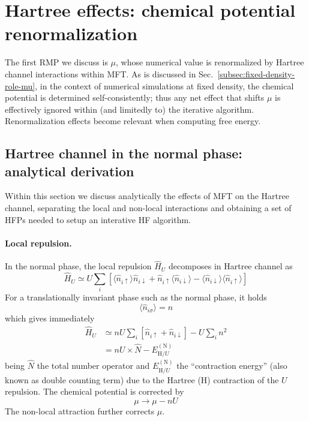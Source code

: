 \section{Hartree effects: chemical potential renormalization}\label{sec:normal-hartree-mu}

The first RMP we discuss is $\mu$, whose numerical value is renormalized by Hartree channel interactions within MFT. As is discussed in Sec.~\ref{subsec:fixed-density-role-mu}, in the context of numerical simulations at fixed density, the chemical potential is determined self-consistently; thus any net effect that shifts $\mu$ is effectively ignored within (and limitedly to) the iterative algorithm. Renormalization effects become relevant when computing free energy.

\subsection{Hartree channel in the normal phase: analytical derivation}\label{subsec:normal-hartree-analytical}

Within this section we discuss analytically the effects of MFT on the Hartree channel, separating the local and non-local interactions and obtaining a set of HFPs needed to setup an interative HF algorithm.

\paragraph{Local repulsion.}

In the normal phase, the local repulsion $\hat H_U$ decomposes in Hartree channel as
\[
	\hat H_U \simeq
	U \sum_{i} \left[
		\langle 
			\hat n_{i\uparrow}
		\rangle \hat n_{i\downarrow} + \hat n_{i\uparrow} \langle 
			\hat n_{i\downarrow}
		\rangle - \langle 
			\hat n_{i\downarrow}
		\rangle \langle 
			\hat n_{i\uparrow}
			\rangle
	\right]
\]
For a translationally invariant phase such as the normal phase, it holds
\begin{equation}\label{eq:normal-density-ansatz}
	\langle \hat n_{i\sigma} \rangle = n
\end{equation}
which gives immediately
\[
\begin{aligned}
	\hat H_U &\simeq
	nU \sum_i \left[
		 \hat n_{i\uparrow} + \hat n_{i\downarrow}
	\right]
	- U \sum_i n^2 \\
	&= nU \times \hat N - E_{\mathrm{H}/U}^{(\mathrm{N})}
\end{aligned}
\]
being $\hat N$ the total number operator and $ E_{\mathrm{H}/U}^{(\mathrm{N})}$ the ``contraction energy'' (also known as double counting term) due to the Hartree (H) contraction of the $U$ repulsion. The chemical potential is corrected by
\begin{equation}\label{eq:local-hartree-mu-shift}
	\mu \to \mu - nU
\end{equation}
The non-local attraction further corrects $\mu$.

